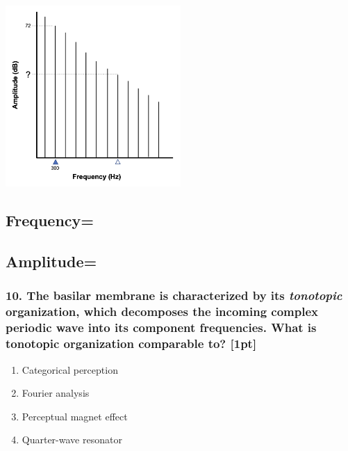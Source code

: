 \documentclass[
  12pt,
]{article}
\providecommand{\tightlist}{%
  \setlength{\itemsep}{0pt}\setlength{\parskip}{0pt}}
\begin{document}
\includegraphics[width=0.5\textwidth,height=0.5\textheight]{images/glottal_spec_fin.png}

\hypertarget{frequency}{%
\subsection{Frequency=}\label{frequency}}

\hypertarget{amplitude}{%
\subsection{Amplitude=}\label{amplitude}}

\pagebreak

\hypertarget{the-basilar-membrane-is-characterized-by-its-tonotopic-organization-which-decomposes-the-incoming-complex-periodic-wave-into-its-component-frequencies.-what-is-tonotopic-organization-comparable-to-1pt}{%
\subsubsection{\texorpdfstring{10. The basilar membrane is characterized
by its \emph{tonotopic} organization, which decomposes the incoming
complex periodic wave into its component frequencies. What is tonotopic
organization comparable to?
{[}1pt{]}}{10. The basilar membrane is characterized by its tonotopic organization, which decomposes the incoming complex periodic wave into its component frequencies. What is tonotopic organization comparable to? {[}1pt{]}}}\label{the-basilar-membrane-is-characterized-by-its-tonotopic-organization-which-decomposes-the-incoming-complex-periodic-wave-into-its-component-frequencies.-what-is-tonotopic-organization-comparable-to-1pt}}

\begin{enumerate}
\def\labelenumi{\alph{enumi}.}
\tightlist
\item
  Categorical perception
\item
  Fourier analysis
\item
  Perceptual magnet effect
\item
  Quarter-wave resonator
\end{enumerate}
\end{document}
